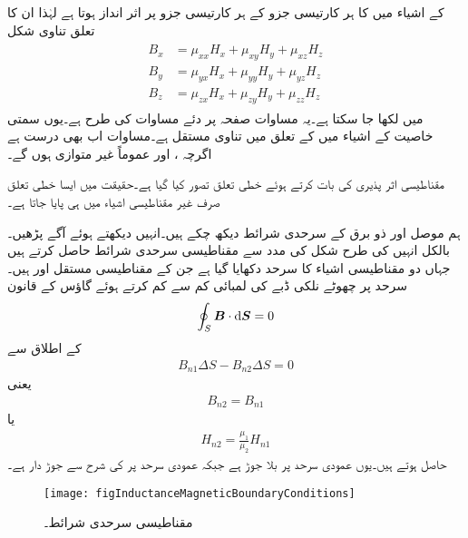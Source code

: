  کے اشیاء میں  کا ہر کارتیسی جزو  کے ہر کارتیسی جزو پر اثر انداز ہوتا ہے لہٰذا ان کا تعلق تناوی شکل
\begin{gather}
\begin{aligned}\label{مساوت_امالہ_تناوی-مساوات}
B_x&=\mu_{xx} H_x +\mu_{xy} H_y+\mu_{xz} H_z\\
B_y&=\mu_{yx} H_x +\mu_{yy} H_y+\mu_{yz} H_z\\
B_z&=\mu_{zx} H_x +\mu_{zy} H_y+\mu_{zz} H_z
\end{aligned}
\end{gather}
میں لکھا جا سکتا ہے۔یہ مساوات صفحہ  پر دئے مساوات  کی طرح ہے۔یوں سمتی خاصیت کے اشیاء میں  کے تعلق میں  تناوی مستقل ہے۔مساوات  اب بھی درست ہے اگرچہ ،  اور  عموماً غیر متوازی ہوں گے۔

مقناطیسی اثر پذیری کی بات کرتے ہوئے خطی تعلق تصور کیا گیا ہے۔حقیقت میں ایسا خطی تعلق صرف غیر مقناطیسی اشیاء میں ہی پایا جاتا ہے۔

ہم موصل اور ذو برق کے سرحدی شرائط دیکھ چکے ہیں۔انہیں دیکھتے ہوئے آگے پڑھیں۔بالکل انہیں کی طرح شکل  کی مدد سے مقناطیسی سرحدی شرائط حاصل کرتے ہیں جہاں دو مقناطیسی اشیاء کا سرحد دکھایا گیا ہے جن کے مقناطیسی مستقل  اور  ہیں۔ سرحد پر چھوٹے نلکی ڈبے کی لمبائی کم سے کم کرتے ہوئے گاؤس کے قانون
\begin{align*}
\oint_S \kvec{B} \cdot \dif \kvec{S}=0
\end{align*}
کے اطلاق سے
\begin{align*}
B_{n1}\Delta S-B_{n2} \Delta S=0
\end{align*}
یعنی
\begin{align}
B_{n2}=B_{n1}
\end{align}
یا
\begin{align}
H_{n2}=\frac{\mu_1}{\mu_2} H_{n1}
\end{align}
حاصل ہوتے ہیں۔یوں عمودی  سرحد پر بلا جوڑ ہے جبکہ عمودی  سرحد پر  کی شرح سے جوڑ دار ہے۔
 \begin{figure}
\centering
\texttt{[image: figInductanceMagneticBoundaryConditions]}
\caption{مقناطیسی سرحدی شرائط۔}
\label{شکل_امالہ_مقناطیسی_سرحدی_شرائط}
\end{figure}

